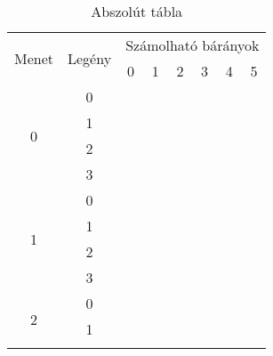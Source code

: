\documentclass{article}
\newcommand{\blk}{\cellcolor{darkgray}}
\newcommand{\red}{\cellcolor{red!33}}
\newcommand{\grn}{\cellcolor{green!33}}
\newcommand{\ylw}{\cellcolor{yellow}}
\newcommand{\nothing}{\text{\raisebox{0.4em}{\rotatebox{180}{$\curvearrowleft$}}}}%
\newcommand{\just}[1]{\boxed{#1}}%
\newcommand{\incl}{\mathbf{incl}}
\newcommand{\excl}{\mathbf{excl}}
\begin{document}
	\setlength{\extrarowheight}{4px}

	\begin{table}[H]
		\caption*{Abszolút tábla}
		\centering
		\begin{tabular}{c|c|c|c|c|c|c|c|}
			\multirow{2}{*}{Menet} &  \multirow{2}{*}{Legény}  &    \multicolumn{6}{c|}{Számolható bárányok}                                                          \\
				               &                           &    0              & 1              & 2              & 3              & 4              & 5              \\\hline\hline
			\multirow{4}{*}{0}     &  0                        &    \nothing       & \nothing       & \nothing       & \nothing       & \nothing       & \grn\just\incl \\\cline{2-8}
				               &  1                        &    \ylw\nothing   & \ylw\nothing   & \ylw\nothing   & \ylw\nothing   & \ylw\nothing   & \ylw\nothing   \\\cline{2-8}
				               &  2                        &    \red\just\excl & \nothing       & \nothing       & \nothing       & \nothing       & \grn\just\incl \\\cline{2-8}
				               &  3                        &    \ylw\nothing   & \ylw\nothing   & \ylw\nothing   & \ylw\nothing   & \ylw\nothing   & \ylw\nothing   \\\hline\hline
			\multirow{4}{*}{1}     &  0                        &    \red\just\excl & \nothing       & \nothing       & \nothing       & \grn\just\incl & \blk           \\\cline{2-8}
				               &  1                        &    \ylw\nothing   & \ylw\nothing   & \ylw\nothing   & \ylw\nothing   & \ylw\nothing   & \ylw           \\\cline{2-8}
				               &  2                        &    \blk           & \red\just\excl & \nothing       & \nothing       & \grn\just\incl & \blk           \\\cline{2-8}
				               &  3                        &    \ylw           & \ylw\nothing   & \ylw\nothing   & \ylw\nothing   & \ylw\nothing   & \ylw           \\\hline\hline
			\multirow{4}{*}{2}     &  0                        &    \blk           & \red\just\excl & \nothing       & \grn\just\incl & \blk           & \blk           \\\cline{2-8}
				               &  1                        &    \ylw           & \ylw\nothing   & \ylw\nothing   & \ylw\nothing   & \ylw           & \ylw           \\\cline{2-8}

\end{tabular}
\end{table}
\end{document}

